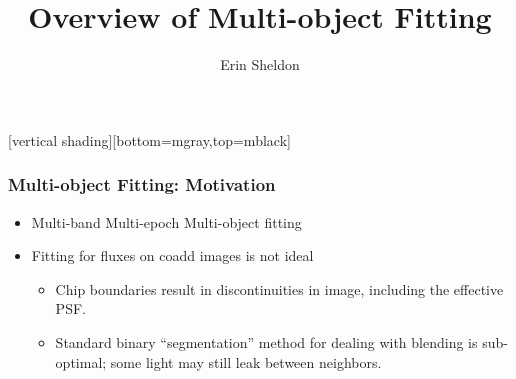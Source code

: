 \documentclass{beamer}
\title{Overview of Multi-object Fitting}
\author{Erin Sheldon}
\institute{Brookhaven National Laboratory}
\begin{document}
\frame{\titlepage}


[vertical shading][bottom=mgray,top=mblack]



\frame
{
    \frametitle{Multi-object Fitting: Motivation}

    \begin{itemize}

        \item Multi-band Multi-epoch Multi-object fitting

            \item Fitting for fluxes on coadd images is not ideal
        \begin{itemize}

            \item Chip boundaries result in discontinuities in image, including
                the effective PSF.

            \item Standard binary ``segmentation'' method for dealing with
                blending is sub-optimal; some light may still leak between
                neighbors.

        \end{itemize}
    \end{itemize}
}
\end{document}
